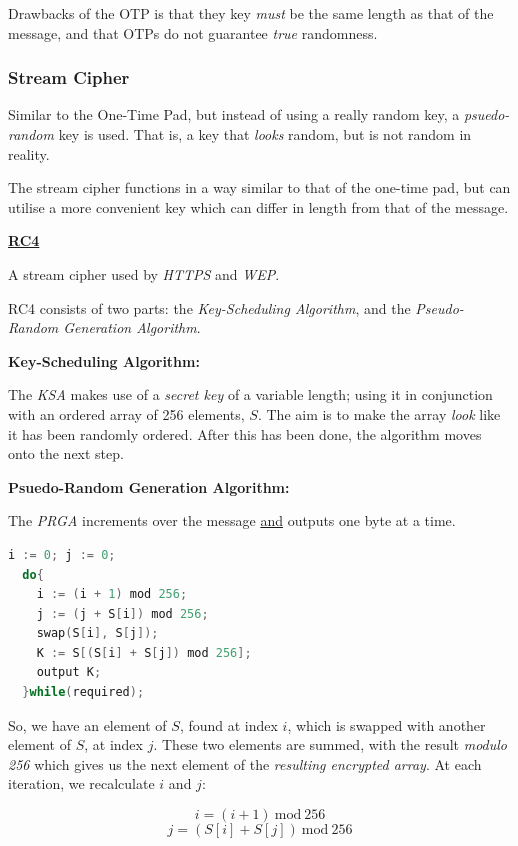 \documentclass{article}
\begin{document}
Drawbacks of the OTP is that they key \textit{must} be the same length as that of the message, and that OTPs do not guarantee \textit{true} randomness.

\filbreak
\subsubsection{Stream Cipher}

Similar to the One-Time Pad, but instead of using a really random key, a \textit{psuedo-random} key is used. That is, a key that \textit{looks} random, but is not random in reality.

The stream cipher functions in a way similar to that of the one-time pad, but can utilise a more convenient key which can differ in length from that of the message.

\textbf{\underline{RC4}}

A stream cipher used by \textit{HTTPS} and \textit{WEP}.

RC4 consists of two parts: the \textit{Key-Scheduling Algorithm}, and the \textit{Pseudo-Random Generation Algorithm}.

\textbf{Key-Scheduling Algorithm:}

The \textit{KSA} makes use of a \textit{secret key} of a variable length; using it in conjunction with an ordered array of 256 elements, $S$. The aim is to make the array \textit{look} like it has been randomly ordered. After this has been done, the algorithm moves onto the next step.

\textbf{Psuedo-Random Generation Algorithm:}

The \textit{PRGA} increments over the message \underline{and} outputs one byte at a time.

\begin{lstlisting}[language=C]
  i := 0; j := 0;
  do{
    i := (i + 1) mod 256;
    j := (j + S[i]) mod 256;
    swap(S[i], S[j]);
    K := S[(S[i] + S[j]) mod 256];
    output K;
  }while(required);
\end{lstlisting}

So, we have an element of $S$, found at index $i$, which is swapped with another element of $S$, at index $j$. These two elements are summed, with the result \textit{modulo 256} which gives us the next element of the \textit{resulting encrypted array}. At each iteration, we recalculate $i$ and $j$:

\[ i = (i + 1)\:\text{mod}\:256\]
\[ j = (S[i] + S[j])\:\text{mod}\:256\]
\end{document}
